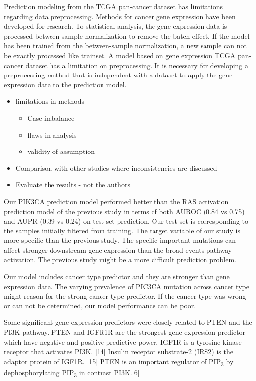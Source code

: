 \documentclass[10pt,letterpaper]{article}
\providecommand{\tightlist}{%
  \setlength{\itemsep}{0pt}\setlength{\parskip}{0pt}}
\begin{document}
Prediction modeling from the TCGA pan-cancer dataset has limitations
regarding data preprocessing. Methods for cancer gene expression have
been developed for research. To statistical analysis, the gene
expression data is processed between-sample normalization to remove the
batch effect. If the model has been trained from the between-sample
normalization, a new sample can not be exactly processed like trainset.
A model based on gene expression TCGA pan-cancer dataset has a
limitation on preprocessing. It is necessary for developing a
preprocessing method that is independent with a dataset to apply the
gene expression data to the prediction model.

\begin{itemize}
\item
  limitations in methods

  \begin{itemize}
  \tightlist
  \item
    Case imbalance\\
  \item
    flaws in analysis\\
  \item
    validity of assumption
  \end{itemize}
\item
  Comparison with other studies where inconsistencies are discussed\\
\item
  Evaluate the results - not the authors
\end{itemize}

Our PIK3CA prediction model performed better than the RAS activation
prediction model of the previous study in terms of both AUROC (0.84 vs
0.75) and AUPR (0.39 vs 0.24) on test set prediction. Our test set is
corresponding to the samples initially filtered from training. The
target variable of our study is more specific than the previous study.
The specific important mutations can affect stronger downstream gene
expression than the broad events pathway activation. The previous study
might be a more difficult prediction problem.

Our model includes cancer type predictor and they are stronger than gene
expression data. The varying prevalence of PIC3CA mutation across cancer
type might reason for the strong cancer type predictor. If the cancer
type was wrong or can not be determined, our model performance can be
poor.

Some significant gene expression predictors were closely related to PTEN
and the PI3K pathway. PTEN and IGFR1R are the strongest gene expression
predictor which have negative and positive predictive power. IGF1R is a
tyrosine kinase receptor that activates PI3K. {[}14{]} Insulin receptor
substrate-2 (IRS2) is the adaptor protein of IGF1R. {[}15{]} PTEN is an
important regulator of PIP\textsubscript{3} by dephosphorylating
PIP\textsubscript{3} in contrast PI3K.{[}6{]}
\end{document}
